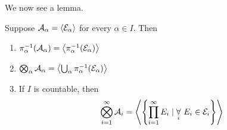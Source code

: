 We now see a lemma.
\begin{lemma}
	Suppose \(\mathcal{\MakeUppercase{a}} _\alpha  = \left< \mathcal{\MakeUppercase{e}} _\alpha  \right> \) for every \(\alpha \in I\). Then
	\begin{enumerate}[(1)]
		\item \(\pi _\alpha ^{-1} (\mathcal{\MakeUppercase{a}} _\alpha ) = \left< \pi ^{-1} _\alpha (\mathcal{\MakeUppercase{e}} _\alpha ) \right> \)
		\item \(\bigotimes_\alpha  \mathcal{\MakeUppercase{a}} _\alpha = \left< \bigcup_{\alpha} \pi _\alpha ^{-1} (\mathcal{\MakeUppercase{e}} _\alpha )\right> \)
		\item If \(I\) is countable, then
		      \[
			      \bigotimes_{i=1}^{\infty }\mathcal{\MakeUppercase{a}} _i = \left< \left\{\prod\limits_{i=1}^{\infty} E_{i} \mid \underset{i}{\forall}\ E_{i}\in \mathcal{\MakeUppercase{e}} _{i}\right\} \right>
		      \]
	\end{enumerate}
\end{lemma}
